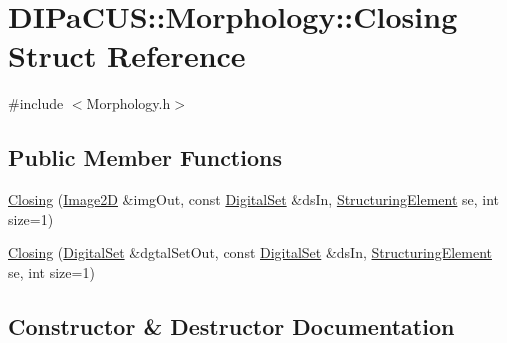 \hypertarget{structDIPaCUS_1_1Morphology_1_1Closing}{}\section{D\+I\+Pa\+C\+US\+:\+:Morphology\+:\+:Closing Struct Reference}
\label{structDIPaCUS_1_1Morphology_1_1Closing}


{\ttfamily \#include $<$Morphology.\+h$>$}

\subsection*{Public Member Functions}
\begin{DoxyCompactItemize}
\item 
\mbox{\hyperlink{structDIPaCUS_1_1Morphology_1_1Closing_a9a072d64762d7f6930c9d38ee4210d19}{Closing}} (\mbox{\hyperlink{namespaceDIPaCUS_1_1Morphology_a9aff9edf28d681accfc54435fbefcbee}{Image2D}} \&img\+Out, const \mbox{\hyperlink{namespaceDIPaCUS_1_1Morphology_ab69fa725716b0ed4c311c0d00a292be7}{Digital\+Set}} \&ds\+In, \mbox{\hyperlink{namespaceDIPaCUS_1_1Morphology_a60b552d68432e7992f09717070d9c4e7}{Structuring\+Element}} se, int size=1)
\item 
\mbox{\hyperlink{structDIPaCUS_1_1Morphology_1_1Closing_a21214c86a260cc3afe70193fd857402f}{Closing}} (\mbox{\hyperlink{namespaceDIPaCUS_1_1Morphology_ab69fa725716b0ed4c311c0d00a292be7}{Digital\+Set}} \&dgtal\+Set\+Out, const \mbox{\hyperlink{namespaceDIPaCUS_1_1Morphology_ab69fa725716b0ed4c311c0d00a292be7}{Digital\+Set}} \&ds\+In, \mbox{\hyperlink{namespaceDIPaCUS_1_1Morphology_a60b552d68432e7992f09717070d9c4e7}{Structuring\+Element}} se, int size=1)
\end{DoxyCompactItemize}


\subsection{Constructor \& Destructor Documentation}
\mbox{\label{structDIPaCUS_1_1Morphology_1_1Closing_a9a072d64762d7f6930c9d38ee4210d19}} 
